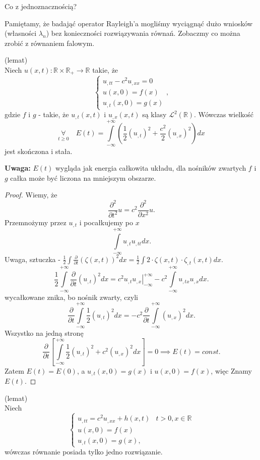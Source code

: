 \documentclass[../main.tex]{subfiles}
\begin{document}
\begin{pytanie}
Co z jednoznacznością?
\end{pytanie}

Pamiętamy, że badająć operator Rayleigh'a mogliśmy wyciągnąć dużo wniosków (własności $\lambda_n$) bez konieczności rozwiązywania równań. Zobaczmy co można zrobić z równaniem falowym.
\begin{stw}
		(lemat)\\
		Niech $u(x,t): \mathbb{R}\times\mathbb{R}_+\to \mathbb{R}$ takie, że
		\[
		\begin{cases}
				u_{,t t}- c^2 u_{,x x}= 0\\
				u(x,0) = f(x)\\
				u_{,t}(x,0) = g(x)
		\end{cases}
		,\]
		gdzie $f$ i $g$ - takie, że $u_{,t}(x,t)$ i $u_{,x}(x,t)$ są klasy $\mathcal{L}^2(\mathbb{R})$. Wówczas wielkość
		\[
				\underset{t\ge 0}{\forall} \quad E(t) = \int\limits_{-\infty}^{+\infty}\left( \frac{1}{2}(u_{,t})^2 + \frac{c^2}{2}(u_{,x})^2 \right) dx
		\]
		jest skończona i stała.
\end{stw}
\textbf{Uwaga:} $E(t)$ wygląda jak energia całkowita układu, dla nośników zwartych $f$ i $g$ całka może być liczona na mniejszym obszarze.
\begin{proof}
		Wiemy, że
		\[
		\frac{\partial ^2}{\partial t^2} u = c^2 \frac{\partial ^2}{\partial x^2} u
		.\]
		Przemnożymy przez $u_{,t}$ i pocałkujemy po $x$
		\[
		\int\limits_{-\infty}^{+\infty}u_{,t}u_{,t t}dx
		.\]
		Uwaga, sztuczka - $\frac{1}{2}\int \frac{\partial }{\partial t} (\zeta(x,t))^2dx = \frac{1}{2}\int 2 \cdot \zeta(x,t) \cdot \zeta_{,t}(x,t)dx.$
		\[
				\frac{1}{2}\int\limits_{-\infty}^{+\infty}\frac{\partial }{\partial t} \left( u_{,t} \right) ^2 dx = \left.c^2 u_{,t}u_{,x}\right|_{-\infty}^{+\infty} - c^2 \int\limits_{-\infty}^{+\infty}u_{,tx}u_{,x}dx
		.\]
		wycałkowane znika, bo nośnik zwarty, czyli
		\[
				\frac{\partial }{\partial t} \int\limits_{-\infty}^{+\infty} \frac{1}{2}(u_{,t})^2dx = -c^2 \frac{\partial }{\partial t} \int\limits_{-\infty}^{+\infty}\left( u_{,x} \right) ^2 dx
		.\]
		Wszystko na jedną stronę
		\[
				\frac{\partial }{\partial t} \left[ \int\limits_{-\infty}^{+\infty}\frac{1}{2}(u_{,t})^2 + c^2 (u_{,x})^2 dx \right] = 0 \implies E(t) = const
		.\]
		Zatem $E(t) = E(0)$, a $u_{,t}(x,0) = g(x)$ i $u(x,0) = f(x)$, więc Znamy  $E(t)$.
\end{proof}
\begin{stw}
		(lemat)\\
		Niech
		\[
		\begin{cases}
				u_{,t t}= c^2 u_{,x x}+h(x,t)&t>0,x\in\mathbb{R}\\
				u(x,0) = f(x)\\
				u_{,t}(x,0) = g(x)
		,\end{cases}
		\]
		wówczas równanie posiada tylko jedno rozwiązanie.
\end{stw}
\end{document}
